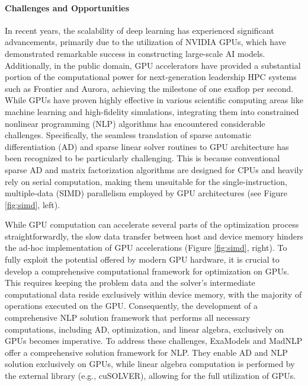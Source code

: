 \paragraph{Challenges and Opportunities}
In recent years, the scalability of deep learning has experienced
significant advancements, primarily due to the utilization of NVIDIA
GPUs, which have demonstrated remarkable success in constructing
large-scale AI models. Additionally, in the public domain, GPU
accelerators have provided a substantial portion of the computational
power for next-generation leadership HPC systems such as Frontier and
Aurora, achieving the milestone of one exaflop per second.  While GPUs
have proven highly effective in various scientific computing areas
like machine learning and high-fidelity simulations, integrating them
into constrained nonlinear programming (NLP) algorithms has encountered
considerable challenges. Specifically, the seamless translation of
sparse automatic differentiation (AD) and sparse linear solver
routines to GPU architecture has been recognized to be particularly
challenging.  This is because conventional sparse AD and matrix
factorization algorithms are designed for CPUs and heavily rely on
serial computation, making them unsuitable for the single-instruction,
multiple-data (SIMD) parallelism employed by GPU architectures (see
Figure \ref{fig:simd}, left).

While GPU computation can accelerate several parts of the optimization
process straightforwardly, the slow data transfer between host and
device memory hinders the ad-hoc implementation of GPU accelerations
(Figure \ref{fig:simd}, right). To fully exploit the potential offered
by modern GPU hardware, it is crucial to develop a comprehensive
computational framework for optimization on GPUs. This requires
keeping the problem data and the solver's intermediate computational
data reside exclusively within device memory, with the majority of
operations executed on the GPU. Consequently, the development of a
comprehensive NLP solution framework that performs
all necessary computations, including AD, optimization, and linear
algebra, exclusively on GPUs becomes imperative.  To address these
challenges, ExaModels and MadNLP offer a comprehensive solution
framework for NLP. They enable AD and NLP solution
exclusively on GPUs, while linear algebra computation is performed by
the external library (e.g., cuSOLVER), allowing for the full
utilization of GPUs.

